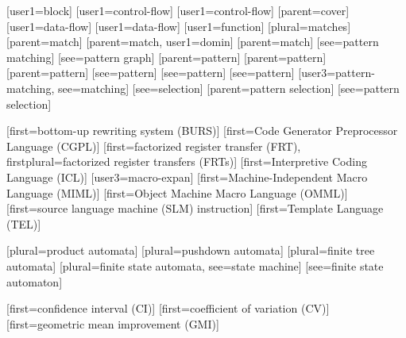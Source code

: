 [user1={block}]
[user1={control-flow}]
[user1={control-flow}]
[parent={cover}]
[user1={data-flow}]
[user1={data-flow}]
[user1={function}]
[plural=matches]
[parent={match}]
[parent={match}, user1={domin}]
[parent={match}]
[see={pattern matching}]
[see={pattern graph}]
[parent={pattern}]
[parent={pattern}]
[parent={pattern}]
[see={pattern}]
[see={pattern}]
[see={pattern}]
[user3={pattern-matching}, see={matching}]
[see={selection}]
[parent={pattern selection}]
[see={pattern selection}]

[first={bottom-up rewriting system (BURS)}]
[first={Code Generator Preprocessor Language (CGPL)}]
%
        [first=factorized register transfer (FRT),
         firstplural=factorized register transfers (FRTs)]
[first={Interpretive Coding Language (ICL)}]
[user3={macro-expan}]%
[first={Machine-Independent Macro Language (MIML)}]
[first={Object Machine Macro Language (OMML)}]
%
        [first={source language machine (SLM) instruction}]
[first={Template Language (TEL)}]

[plural={product automata}]
[plural={pushdown automata}]
%
        [plural={finite tree automata}]
%
        [plural={finite state automata}, see={state machine}]
[see={finite state automaton}]


[first={confidence interval (CI)}]
[first={coefficient of variation (CV)}]
[first={geometric mean improvement (GMI)}]
